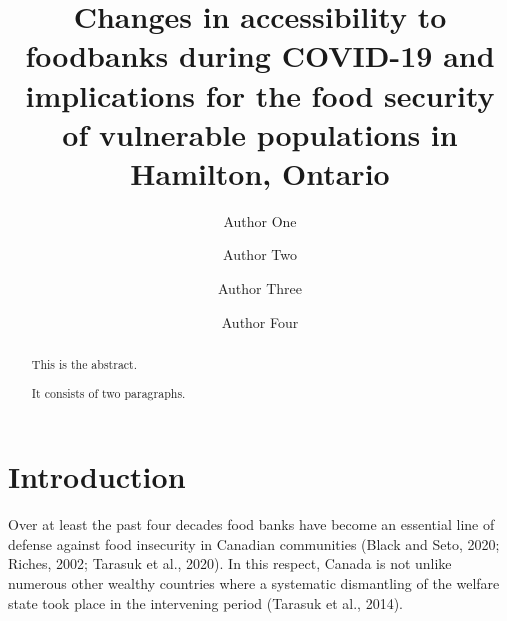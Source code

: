 \documentclass[]{elsarticle} %
\begin{document}
\begin{frontmatter}

  \title{Changes in accessibility to foodbanks during COVID-19 and
implications for the food security of vulnerable populations in
Hamilton, Ontario}
    \author[Some University]{Author One}
    \author[]{Author Two}
    \author[Some University]{Author Three}
    \author[Another University]{Author Four}
      \address[Some University]{Department, Street, City, State, Zip}
    \address[Another University]{Department, Street, City, State, Zip}
  
  \begin{abstract}
  This is the abstract.

  It consists of two paragraphs.
  \end{abstract}
  
 \end{frontmatter}

\newpage

\hypertarget{introduction}{%
\section{Introduction}\label{introduction}}

Over at least the past four decades food banks have become an essential
line of defense against food insecurity in Canadian communities (Black
and Seto, 2020; Riches, 2002; Tarasuk et al., 2020). In this respect,
Canada is not unlike numerous other wealthy countries where a systematic
dismantling of the welfare state took place in the intervening period
(Tarasuk et al., 2014).
\end{document}
